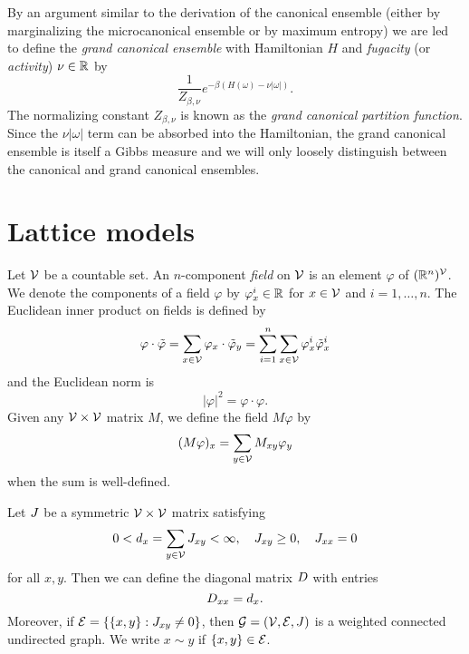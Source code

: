 By an argument similar to the derivation of the canonical ensemble (either by marginalizing
the microcanonical ensemble or by maximum entropy) we are led to define the \emph{grand
canonical ensemble} with Hamiltonian $H$ and \emph{fugacity} (or \emph{activity}) $\nu \in {\mathbb R}$ by
\begin{equation}
\frac{1}{Z_{\beta,\nu}} e^{-\beta (H(\omega) - \nu |\omega|)}.
\end{equation}
The normalizing constant $Z_{\beta,\nu}$ is known as the \emph{grand canonical partition function}.
Since the $\nu |\omega|$ term can be absorbed into the Hamiltonian,
the grand canonical ensemble is itself a Gibbs measure and we will only loosely
distinguish between the canonical and grand canonical ensembles. 


\section{Lattice models}


Let $\mathcal{V}$ be a countable set. An $n$-component \emph{field} on $\mathcal{V}$
is an element $\varphi$ of $({\mathbb R}^n)^{\mathcal{V}}$.
We denote the components of a field $\varphi$
by $\varphi^i_x \in {\mathbb R}$ for $x \in \mathcal{V}$ and $i = 1, \ldots, n$.
The Euclidean inner product on fields is defined by
\begin{equation}
\varphi\cdot\tilde\varphi
  =
\sum_{x\in\mathcal{V}} \varphi_x \cdot \tilde\varphi_y
  =
\sum_{i=1}^n \sum_{x\in\mathcal{V}} \varphi^i_x \tilde\varphi^i_x
\end{equation}
and the Euclidean norm is
\begin{equation}
|\varphi|^2 = \varphi \cdot \varphi.
\end{equation}
Given any $\mathcal{V}\times\mathcal{V}$ matrix $M$, we define the field $M \varphi$ by
\begin{equation}
(M \varphi)_x = \sum_{y\in\mathcal{V}} M_{xy} \varphi_y
\end{equation}
when the sum is well-defined.

Let $J$ be a symmetric $\mathcal{V}\times\mathcal{V}$ matrix satisfying
\begin{equation}
0 < d_x = \sum_{y\in\mathcal{V}} J_{xy} < \infty,
  \quad
J_{xy} \ge 0,
  \quad
J_{xx} = 0
\end{equation}
for all $x, y$. Then we can define the diagonal matrix $D$ with entries
\begin{equation}
D_{xx} = d_x.
\end{equation}
Moreover, if $\mathcal{E} = \{ \{ x, y \} : J_{xy} \ne 0 \}$, then
$\mathcal{G} = (\mathcal{V}, \mathcal{E}, J)$ is a weighted connected undirected graph.
We write $x \sim y$ if $\{ x, y \} \in \mathcal{E}$.

